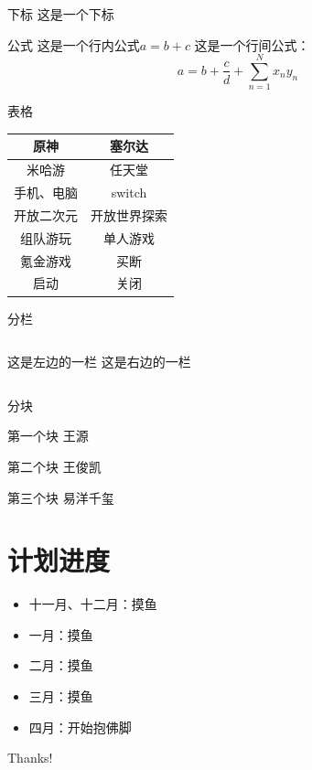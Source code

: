 \begin{frame}{下标}
    这是一个下标\footnotemark[1]
\end{frame}

\begin{frame}{公式}
    这是一个行内公式$a=b+c$
    这是一个行间公式：
    $$
    a=b+\frac{c}{d}+\sum _{n=1}^{N} x_ny_n
    $$
\end{frame}

\begin{frame}{表格}
\begin{table}[h]
    \centering
    \begin{tabular}{c|c}
        原神 & 塞尔达 \\
        \hline
        米哈游 & 任天堂 \\
        手机、电脑 & switch \\
        开放二次元 & 开放世界探索 \\
        组队游玩 & 单人游戏 \\
        氪金游戏 & 买断 \\
        启动 & 关闭 \\
    \end{tabular}
\end{table}
\end{frame}

\begin{frame}{分栏}
    \begin{columns}
        这是左边的一栏
        这是右边的一栏
    \end{columns}
\end{frame}

\begin{frame}{分块}
    \begin{block}{第一个块}
    王源
    \end{block} 
    \begin{block}{第二个块}
    王俊凯
    \end{block} 
    \begin{block}{第三个块}
    易洋千玺
    \end{block} 
\end{frame}

\section{计划进度}

\begin{frame}
    \begin{itemize}
        \item 十一月、十二月：摸鱼
        \item 一月：摸鱼
        \item 二月：摸鱼
        \item 三月：摸鱼
        \item 四月：开始抱佛脚
    \end{itemize}
\end{frame}

\begin{frame}
    \begin{center}
        {\Huge\calligra Thanks!}
    \end{center}
\end{frame}

